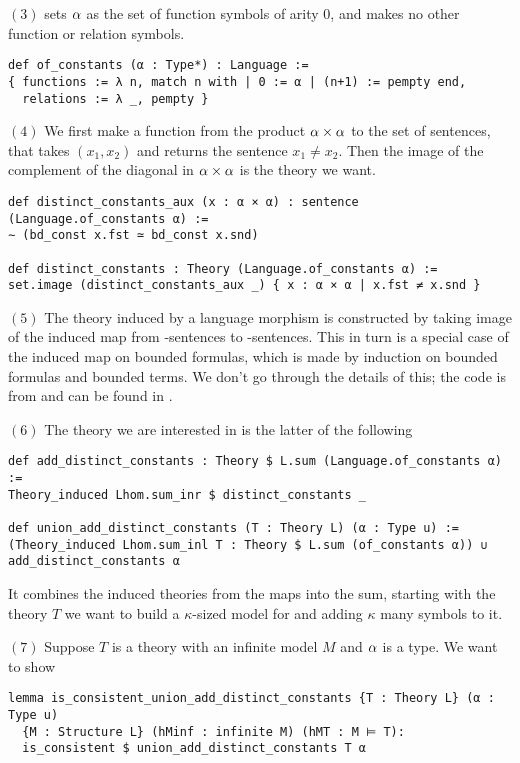 $(3)$  sets $\alpha$ as the set of function symbols
of arity $0$, and makes no other function or relation symbols.
\begin{lstlisting}
def of_constants (α : Type*) : Language :=
{ functions := λ n, match n with | 0 := α | (n+1) := pempty end,
  relations := λ _, pempty } \end{lstlisting}

$(4)$ We first make a function from the product $\alpha \times \alpha$ to
the set of sentences, that takes $(x_1,x_2)$ and returns the sentence
$x_{1} \ne x_{2}$.
Then the image of the complement of the diagonal in $\alpha \times \alpha$
is the theory we want.

\begin{lstlisting}
def distinct_constants_aux (x : α × α) : sentence (Language.of_constants α) :=
∼ (bd_const x.fst ≃ bd_const x.snd)

def distinct_constants : Theory (Language.of_constants α) :=
set.image (distinct_constants_aux _) { x : α × α | x.fst ≠ x.snd } \end{lstlisting}

$(5)$ The theory induced by a language morphism is constructed by
taking image of the induced map from -sentences
to -sentences.
This in turn is a special case of the induced map on bounded formulas,
which is made by induction on bounded formulas and bounded terms.
We don't go through the details of this;
the code is from  and can be found in
.

$(6)$ The theory we are interested in is the latter of the following
\begin{lstlisting}
def add_distinct_constants : Theory $ L.sum (Language.of_constants α) :=
Theory_induced Lhom.sum_inr $ distinct_constants _

def union_add_distinct_constants (T : Theory L) (α : Type u) :=
(Theory_induced Lhom.sum_inl T : Theory $ L.sum (of_constants α)) ∪ add_distinct_constants α \end{lstlisting}
It combines the induced theories from the maps into the sum,
starting with the theory $T$ we want to build a $\kappa$-sized
model for and adding $\kappa$ many symbols to it.

$(7)$ Suppose $T$ is a theory with an infinite model $M$ and $\alpha$ is a type.
We want to show

\begin{lstlisting}
lemma is_consistent_union_add_distinct_constants {T : Theory L} (α : Type u)
  {M : Structure L} (hMinf : infinite M) (hMT : M ⊨ T):
  is_consistent $ union_add_distinct_constants T α
\end{lstlisting}


